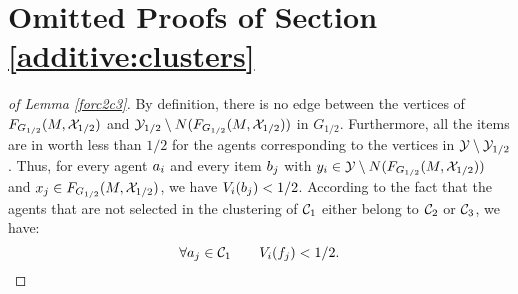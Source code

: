 \section{Omitted Proofs of Section \ref{additive:clusters}}\label{clusteringappendix}

\begin{proof}[of Lemma \ref{forc2c3}]
By definition, there is no edge between the vertices of $F_{G_{1/2}}(M,\mathcal{X}_{1/2})$ and $\mathcal{Y}_{1/2} \setminus N(F_{G_{1/2}}(M,\mathcal{X}_{1/2}))$ in $G_{1/2}$. Furthermore, all the items are in worth less than $1/2$ for the agents corresponding to the vertices in $\mathcal{Y} \setminus \mathcal{Y}_{1/2}$. Thus, for every agent $a_i$ and every item $b_j$ with $y_i \in \mathcal{Y} \setminus N(F_{G_{1/2}}(M,\mathcal{X}_{1/2}))$ and $x_j \in F_{G_{1/2}}(M,\mathcal{X}_{1/2})$, we have $V_i(b_j)<1/2$. According to the fact that the agents that are not selected in the clustering of $\mathcal{C}_1$ either belong to $\mathcal{C}_2$ or $\mathcal{C}_3$, we have:
\[ \forall a_j \in \mathcal{C}_1 \qquad V_i(f_j) < 1/2. \]
\end{proof}

